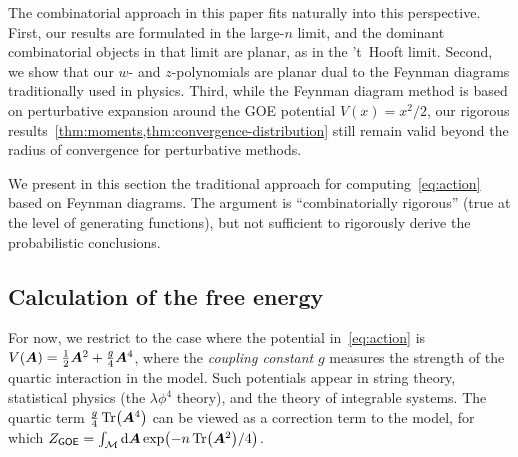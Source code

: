 The combinatorial approach in this paper fits naturally into this perspective. First,
our results are formulated in the large-$n$ limit, and the dominant combinatorial
objects in that limit are planar, as in the 't~Hooft limit. Second, we show that our
$w$- and $z$-polynomials are planar dual to the Feynman diagrams
traditionally used in physics. Third, while the Feynman diagram method is based on perturbative expansion around the GOE potential $V(x) = x^2/2$, our rigorous results~\cref{thm:moments,thm:convergence-distribution} still remain valid
beyond the radius of convergence for perturbative methods.

We present 
in this section the traditional approach
for computing~\cref{eq:action} based on
Feynman diagrams. The argument is ``combinatorially rigorous''
(true at the level of generating functions),
but not sufficient to rigorously derive the probabilistic conclusions.


\subsection{Calculation of the free energy}


For now, we restrict to the case where the potential in~\cref{eq:action} is $V({\bm A}) = \frac 12 {\bm A}^2 + \frac{g}{4}{\bm A}^4$, where the \emph{coupling constant} $g$ measures the strength of the quartic interaction in the model. Such potentials appear in string theory, statistical physics (the $\lambda\phi^4$ theory), and the theory of integrable systems. The quartic term $\frac g4 \Tr({\bm A}^4)$ can be viewed as a correction term to the \goe model, for which $Z_\textsf{\upshape GOE} = \int_{\cal M} {\textnormal d}{\bm A} \exp(-n\Tr({\bm A}^2)/4)$.

